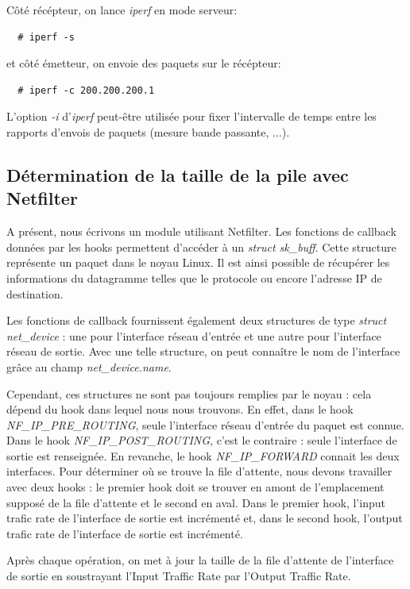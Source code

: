 \documentclass[a4paper]{article}
\begin{document}
Côté récépteur, on lance \textit{iperf} en mode serveur:
\begin{verbatim}
  # iperf -s
\end{verbatim}

et côté émetteur, on envoie des paquets sur le récépteur:
\begin{verbatim}
  # iperf -c 200.200.200.1
\end{verbatim}

L'option \textit{-i} d'\textit{iperf} peut-être utilisée
pour fixer l'intervalle de temps entre les rapports
d'envois de paquets (mesure bande passante, $\ldots$).

\subsection{Détermination de la taille de la pile avec Netfilter}
A présent, nous écrivons un module utilisant Netfilter. Les
fonctions de callback données par les hooks permettent
d'accéder à un \textit{struct sk\_buff}. Cette structure représente
un paquet dans le noyau Linux. Il est ainsi possible de récupérer
les informations du datagramme telles que le protocole ou encore
l'adresse IP de destination.

Les fonctions de callback fournissent également deux structures
de type \textit{struct net\_device} : une pour l'interface réseau
d'entrée et une autre pour l'interface réseau de sortie. Avec
une telle structure, on peut connaître le nom de l'interface
grâce au champ \textit{net\_device.name}.

Cependant, ces structures ne sont pas toujours remplies par le noyau : cela 
dépend du hook dans lequel nous nous trouvons. En effet, dans le hook \textit{NF\_IP\_PRE\_ROUTING}, 
seule l'interface réseau d'entrée du paquet est connue. Dans le hook \textit{NF\_IP\_POST\_ROUTING}, 
c'est le contraire : seule l'interface de sortie est renseignée. En revanche, le hook \textit{NF\_IP\_FORWARD} 
connait les deux interfaces.
Pour déterminer où se trouve la file d'attente, nous devons travailler avec deux hooks : 
le premier hook doit se trouver en amont de l'emplacement supposé de la file d'attente et le second en aval. 
Dans le premier hook, l'input trafic rate de l'interface de sortie est incrémenté et, dans le second hook, 
l'output trafic rate de l'interface de sortie est incrémenté.
 
Après chaque opération, on met à jour la taille de la file
d'attente de l'interface de sortie en soustrayant l'Input Traffic
Rate par l'Output Traffic Rate.
\end{document}

